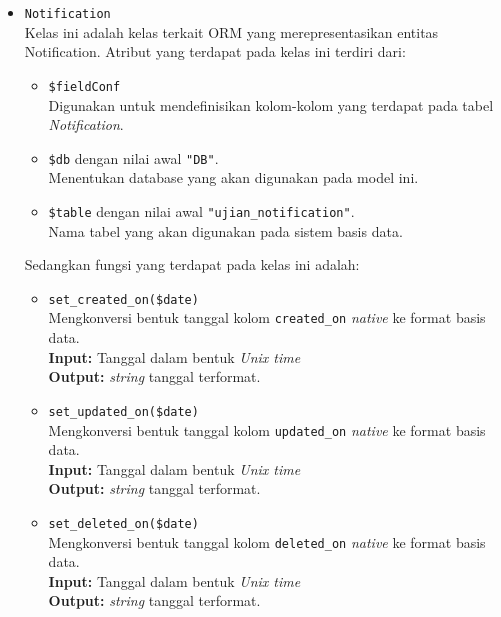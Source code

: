 \begin{itemize}
        \item \texttt{Notification} \\
            Kelas ini adalah kelas terkait ORM yang merepresentasikan entitas Notification. Atribut yang 
            terdapat pada kelas ini terdiri dari:
            \begin{itemize}
                \item \texttt{\$fieldConf} \\
                    Digunakan untuk mendefinisikan kolom-kolom yang terdapat pada tabel \textit{Notification}.
                \item \texttt{\$db} dengan nilai awal \texttt{"DB"}. \\
                    Menentukan database yang akan digunakan pada model ini.
                \item \texttt{\$table} dengan nilai awal \texttt{"ujian\_notification"}. \\
                    Nama tabel yang akan digunakan pada sistem basis data. 
            \end{itemize}
            Sedangkan fungsi yang terdapat pada kelas ini adalah:
            \begin{itemize}
                \item \texttt{set\_created\_on(\$date)} \\
                    Mengkonversi bentuk tanggal kolom \texttt{created\_on} \textit{native} ke 
                    format basis data. \\
                    \textbf{Input:} Tanggal dalam bentuk \textit{Unix time}\\
                    \textbf{Output:} \textit{string} tanggal terformat.
                
                \item \texttt{set\_updated\_on(\$date)} \\
                    Mengkonversi bentuk tanggal kolom \texttt{updated\_on} \textit{native} ke 
                    format basis data. \\
                    \textbf{Input:} Tanggal dalam bentuk \textit{Unix time}\\
                    \textbf{Output:} \textit{string} tanggal terformat.
                    
                \item \texttt{set\_deleted\_on(\$date)} \\
                    Mengkonversi bentuk tanggal kolom \texttt{deleted\_on} \textit{native} ke 
                    format basis data. \\
                    \textbf{Input:} Tanggal dalam bentuk \textit{Unix time}\\
                    \textbf{Output:} \textit{string} tanggal terformat.
                    

\end{itemize}
\end{itemize}
